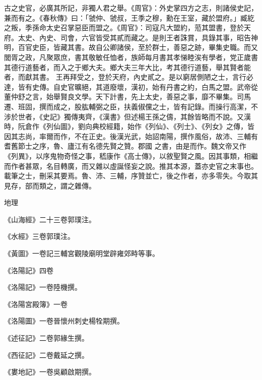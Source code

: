 \begin{pinyinscope}
 古之史官，必廣其所記，非獨人君之舉。《周官》：外史掌四方之志，則諸侯史記，兼而有之。《春秋傳》曰：「虢仲、虢叔，王季之穆，勳在王室，藏於盟府。」臧紇之叛，季孫命太史召掌惡臣而盟之。《周官》：司寇凡大盟約，蒞其盟書，登於天府。太史、內史、司會，六官皆受其貳而藏之。是則王者誅賞，具錄其事，昭告神明，百官史臣，皆藏其書。故自公卿諸侯，至於群士，善惡之跡，畢集史職。而又閭胥之政，凡聚眾庶，書其敬敏任恤者，族師每月書其孝悌睦涘有學者，党正歲書其德行道藝者，而入之于鄉大夫。鄉大夫三年大比，考其德行道藝，舉其賢者能者，而獻其書。
 王再拜受之，登於天府，內史貳之。是以窮居側陋之士，言行必達，皆有史傳。自史官曠絕，其道廢壞，漢初，始有丹書之約，白馬之盟。武帝從董仲舒之言，始舉賢良文學。天下計書，先上太史，善惡之事，靡不畢集。司馬遷、班固，撰而成之，股肱輔弼之臣，扶義俶儻之士，皆有記錄。而操行高潔，不涉於世者，《史記》獨傳夷齊，《漢書》但述楊王孫之儔，其餘皆略而不說。又漢時，阮倉作《列仙圖》，劉向典校經籍，始作《列仙》、《列士》、《列女》之傳，皆因其志尚，率爾而作，不在正史。後漢光武，始詔南陽，撰作風俗，故沛、三輔有耆舊節士之序，魯、廬江有名德先賢之贊。郡國
 之書，由是而作。魏文帝又作《列異》，以序鬼物奇怪之事，嵇康作《高士傳》，以敘聖賢之風。因其事類，相繼而作者甚眾，名目轉廣，而又雜以虛誕怪妄之說。推其本源，蓋亦史官之末事也。載筆之士，刪采其要焉。魯、沛、三輔，序贊並亡，後之作者，亦多零失。今取其見存，部而類之，謂之雜傳。



 地理



 《山海經》二十三卷郭璞注。



 《水經》三卷郭璞注。



 《黃圖》一卷記三輔宮觀陵廟明堂辟雍郊畤等事。



 《洛陽記》四卷



 《洛陽記》一卷陸機撰。



 《洛陽宮殿簿》一卷



 《洛陽圖》一卷晉懷州刺史楊牷期撰。



 《述征記》二卷郭緣生撰。



 《西征記》二卷戴延之撰。



 《婁地記》一卷吳顧啟期撰。




\end{pinyinscope}

